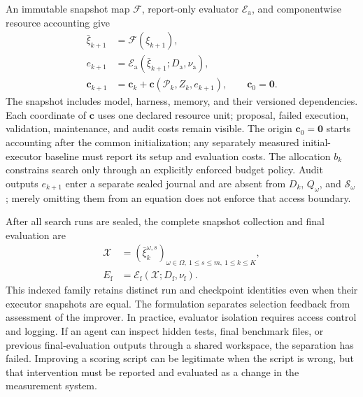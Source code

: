 An immutable snapshot map $\mathcal F$, report-only evaluator $\mathcal E_{\mathrm a}$, and componentwise resource accounting give
\begin{equation}
\label{eq:C30:improver-audit}
\begin{aligned}
 \bar\xi_{k+1}&=\mathcal F(\xi_{k+1}),\\
 e_{k+1}&=\mathcal E_{\mathrm a}
          (\bar\xi_{k+1};D_{\mathrm a},\nu_{\mathrm a}),\\
 \mathbf c_{k+1}&=\mathbf c_k+
       \mathbf c(\mathcal P_k,Z_k,e_{k+1}),\qquad\mathbf c_0=\mathbf0.
\end{aligned}
\end{equation}
The snapshot includes model, harness, memory, and their versioned dependencies. Each coordinate of $\mathbf c$ uses one declared resource unit; proposal, failed execution, validation, maintenance, and audit costs remain visible. The origin $\mathbf c_0=\mathbf0$ starts accounting after the common initialization; any separately measured initial-executor baseline must report its setup and evaluation costs. The allocation $b_k$ constrains search only through an explicitly enforced budget policy. Audit outputs $e_{k+1}$ enter a separate sealed journal and are absent from $D_k$, $Q_\omega$, and $\mathcal S_\omega$; merely omitting them from an equation does not enforce that access boundary.

After all search runs are sealed, the complete snapshot collection and final evaluation are
\begin{equation}
\label{eq:C30:improver-final}
\begin{aligned}
 \mathcal X&=(\bar\xi_k^{\omega,s})_{
       \omega\in\Omega,\ 1\leq s\leq m,\ 1\leq k\leq K},\\
 E_{\mathrm f}&=\mathcal E_{\mathrm f}(\mathcal X;D_{\mathrm f},\nu_{\mathrm f}).
\end{aligned}
\end{equation}
This indexed family retains distinct run and checkpoint identities even when their executor snapshots are equal. The formulation separates selection feedback from assessment of the improver. In practice, evaluator isolation requires access control and logging. If an agent can inspect hidden tests, final benchmark files, or previous final-evaluation outputs through a shared workspace, the separation has failed. Improving a scoring script can be legitimate when the script is wrong, but that intervention must be reported and evaluated as a change in the measurement system.

